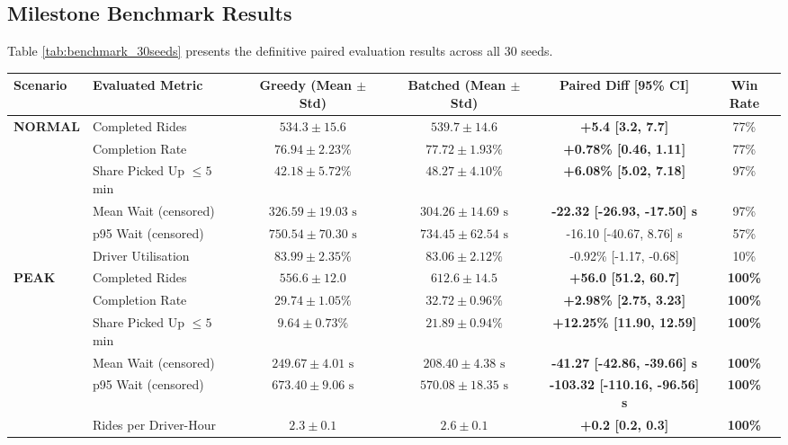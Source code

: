 \documentclass[11pt,a4paper]{article}
\begin{document}
\subsection{Milestone Benchmark Results}
Table \ref{tab:benchmark_30seeds} presents the definitive paired evaluation results across all 30 seeds.

\begin{table}[htbp]
\centering
\small
\begin{tabularx}{\textwidth}{l l c c c c}
\toprule
\textbf{Scenario} & \textbf{Evaluated Metric} & \textbf{Greedy (Mean $\pm$ Std)} & \textbf{Batched (Mean $\pm$ Std)} & \textbf{Paired Diff [95\% CI]} & \textbf{Win Rate} \\
\midrule
\textbf{NORMAL} & Completed Rides & $534.3 \pm 15.6$ & $539.7 \pm 14.6$ & \textbf{+5.4 [3.2, 7.7]} & 77\% \\
& Completion Rate & $76.94 \pm 2.23\%$ & $77.72 \pm 1.93\%$ & \textbf{+0.78\% [0.46, 1.11]} & 77\% \\
& Share Picked Up $\le 5$ min & $42.18 \pm 5.72\%$ & $48.27 \pm 4.10\%$ & \textbf{+6.08\% [5.02, 7.18]} & 97\% \\
& Mean Wait (censored) & $326.59 \pm 19.03\text{ s}$ & $304.26 \pm 14.69\text{ s}$ & \textbf{-22.32 [-26.93, -17.50] s} & 97\% \\
& p95 Wait (censored) & $750.54 \pm 70.30\text{ s}$ & $734.45 \pm 62.54\text{ s}$ & -16.10 [-40.67, 8.76] s & 57\% \\
& Driver Utilisation & $83.99 \pm 2.35\%$ & $83.06 \pm 2.12\%$ & -0.92\% [-1.17, -0.68] & 10\% \\
\midrule
\textbf{PEAK} & Completed Rides & $556.6 \pm 12.0$ & $612.6 \pm 14.5$ & \textbf{+56.0 [51.2, 60.7]} & \textbf{100\%} \\
& Completion Rate & $29.74 \pm 1.05\%$ & $32.72 \pm 0.96\%$ & \textbf{+2.98\% [2.75, 3.23]} & \textbf{100\%} \\
& Share Picked Up $\le 5$ min & $9.64 \pm 0.73\%$ & $21.89 \pm 0.94\%$ & \textbf{+12.25\% [11.90, 12.59]} & \textbf{100\%} \\
& Mean Wait (censored) & $249.67 \pm 4.01\text{ s}$ & $208.40 \pm 4.38\text{ s}$ & \textbf{-41.27 [-42.86, -39.66] s} & \textbf{100\%} \\
& p95 Wait (censored) & $673.40 \pm 9.06\text{ s}$ & $570.08 \pm 18.35\text{ s}$ & \textbf{-103.32 [-110.16, -96.56] s} & \textbf{100\%} \\
& Rides per Driver-Hour & $2.3 \pm 0.1$ & $2.6 \pm 0.1$ & \textbf{+0.2 [0.2, 0.3]} & \textbf{100\%} \\

\end{tabularx}
\end{table}
\end{document}
